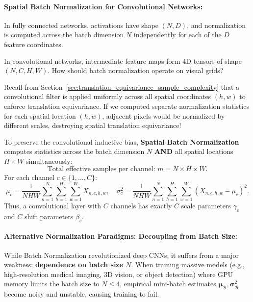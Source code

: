 \paragraph{Spatial Batch Normalization for Convolutional Networks:}
In fully connected networks, activations have shape $(N, D)$, and normalization is computed across the batch dimension $N$ independently for each of the $D$ feature coordinates.

In convolutional networks, intermediate feature maps form 4D tensors of shape $(N, C, H, W)$. How should batch normalization operate on visual grids?

Recall from Section~\ref{sec:translation_equivariance_sample_complexity} that a convolutional filter is applied uniformly across all spatial coordinates $(h, w)$ to enforce translation equivariance. If we computed separate normalization statistics for each spatial location $(h, w)$, adjacent pixels would be normalized by different scales, destroying spatial translation equivariance!

To preserve the convolutional inductive bias, \textbf{Spatial Batch Normalization} computes statistics across the batch dimension $N$ \textbf{AND} all spatial locations $H \times W$ simultaneously:
\begin{equation}
\text{Total effective samples per channel: } m = N \times H \times W.
\label{eq:spatial_bn_m}
\end{equation}
For each channel $c \in \{1, \dots, C\}$:
\begin{equation}
\mu_c = \frac{1}{N H W} \sum_{n=1}^N \sum_{h=1}^H \sum_{w=1}^W X_{n, c, h, w}, \quad \sigma_c^2 = \frac{1}{N H W} \sum_{n=1}^N \sum_{h=1}^H \sum_{w=1}^W (X_{n, c, h, w} - \mu_c)^2.
\label{eq:spatial_bn_stats}
\end{equation}
Thus, a convolutional layer with $C$ channels has exactly $C$ scale parameters $\gamma_c$ and $C$ shift parameters $\beta_c$.

\paragraph{Alternative Normalization Paradigms: Decoupling from Batch Size:}
While Batch Normalization revolutionized deep CNNs, it suffers from a major weakness: \textbf{dependence on batch size $N$}. When training massive models (e.g., high-resolution medical imaging, 3D vision, or object detection) where GPU memory limits the batch size to $N \le 4$, empirical mini-batch estimates $\boldsymbol{\mu}_{\mathcal{B}}, \boldsymbol{\sigma}_{\mathcal{B}}^2$ become noisy and unstable, causing training to fail.

